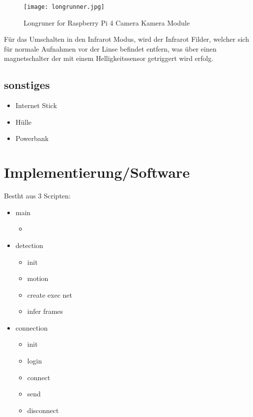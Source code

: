 \begin{figure}[H]
    \centering
    \texttt{[image: longrunner.jpg]}
    \caption{Longruner for Raspberry Pi 4 Camera Kamera Module}
    \label{fig:rpicam}
\end{figure}

Für das Umschalten in den Infrarot Modus, wird der Infrarot Filder, welcher sich 
für normale Aufnahmen vor der Linse befindet entfern, was über einen magnetschalter 
der mit einem Helligkeitssensor getriggert wird erfolg.

 

\subsection*{sonstiges}
\begin{itemize}
    \item Internet Stick%
    \item Hülle
    \item Powerbank
\end{itemize}

\section{Implementierung/Software}

Bestht aus 3 Scripten:

\begin{itemize}
    \item main
    \begin{itemize}
        \item 
    \end{itemize}
    \item detection
    \begin{itemize}
        \item init
        \item motion
        \item create exec net
        \item infer frames
    \end{itemize}
    \item connection
    \begin{itemize}
        \item init
        \item login
        \item connect
        \item send
        \item disconnect
    \end{itemize}
\end{itemize}

